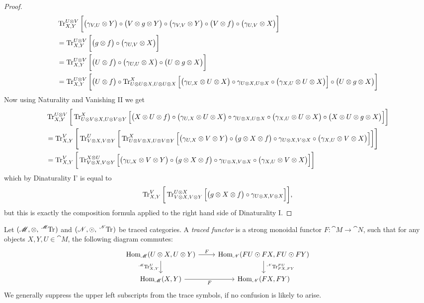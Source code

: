 \documentclass[12pt,oneside,article,draft]{memoir}
\begin{document}
{\begin{proof}
{ \begin{align*}
  &\operatorname{Tr}^{U\otimes V}_{X,Y}\bigg[\big(\gamma_{V,U}\otimes Y\big)\circ\big(V\otimes g\otimes Y\big)\circ\big(\gamma_{V,V}\otimes Y\big)\circ\big(V\otimes f\big)\circ\big(\gamma_{U,V}\otimes X\big)\bigg]\\
  &=\operatorname{Tr}^{U\otimes V}_{X,Y}\bigg[\big(g\otimes f\big)\circ\big(\gamma_{U,V}\otimes X\big)\bigg]\\
  &=\operatorname{Tr}^{U\otimes V}_{X,Y}\bigg[\big(U\otimes f\big)\circ\big(\gamma_{U,U}\otimes X\big)\circ\big(U\otimes g\otimes X\big)\bigg]\\
  &=\operatorname{Tr}^{U\otimes V}_{X,Y}\bigg[\big(U\otimes f\big)\circ\operatorname{Tr}^X_{U\otimes U\otimes X,U\otimes U\otimes X}\Big[\big(\gamma_{U,X}\otimes U\otimes X\big)\circ\gamma_{U\otimes X, U\otimes X}\circ\big(\gamma_{X,U}\otimes U\otimes X\big)\Big]\circ\big(U\otimes g\otimes X\big)\bigg]
 \end{align*}
 Now using Naturality and Vanishing II we get
 \begin{align*}
  &\operatorname{Tr}^{U\otimes V}_{X,Y}\bigg[\operatorname{Tr}^X_{U\otimes V\otimes X,U\otimes V\otimes Y}\Big[\big(X\otimes U\otimes f\big)\circ\big(\gamma_{U,X}\otimes U\otimes X\big)\circ\gamma_{U\otimes X, U\otimes X}\circ\big(\gamma_{X,U}\otimes U\otimes X\big)\circ\big(X\otimes U\otimes g\otimes X\big)\Big]\bigg]\\
  &=\operatorname{Tr}^V_{X,Y}\Bigg[\operatorname{Tr}^U_{V\otimes X,V\otimes Y}\bigg[\operatorname{Tr}^X_{U\otimes V\otimes X,U\otimes V\otimes Y}\Big[\big(\gamma_{U,X}\otimes V\otimes Y\big)\circ\big(g\otimes X\otimes f\big)\circ\gamma_{U\otimes X, V\otimes X}\circ\big(\gamma_{X,U}\otimes V\otimes X\big)\Big]\bigg]\Bigg]\\
  &=\operatorname{Tr}^V_{X,Y}\bigg[\operatorname{Tr}^{X\otimes U}_{V\otimes X,V\otimes Y}\Big[\big(\gamma_{U,X}\otimes V\otimes Y\big)\circ\big(g\otimes X\otimes f\big)\circ\gamma_{U\otimes X, V\otimes X}\circ\big(\gamma_{X,U}\otimes V\otimes X\big)\Big]\bigg]
 \end{align*}
 which by Dinaturality I' is equal to
 \[\operatorname{Tr}^V_{X,Y}\bigg[\operatorname{Tr}^{U\otimes X}_{V\otimes X,V\otimes Y}\Big[\big(g\otimes X\otimes f\big)\circ\gamma_{U\otimes X, V\otimes X}\Big]\bigg],\]
 but this is exactly the composition formula applied to the right hand side of Dinaturality I.}%
\end{proof}
\begin{definition}\label{def:traced functor}

Let $(\cat{M},\otimes,\tensor*[^{\cat{M}}]{\Tr}{})$ and $(\cat{N},\odot,\tensor*[^{\cat{N}}]{\Tr}{})$ be traced categories. A \emph{traced functor} is a strong monoidal functor $F\colon\cat{M}\to\cat{N}$, such that for any objects $X,Y,U\in\cat{M}$, the following diagram commutes:
$$
\begin{tikzcd}
	\Hom_{\cat{M}}(U\otimes X,U\otimes Y)
		\rar{F}
		\dar[swap]{\tensor*[^{\cat{M}}]{\Tr}{^U_{X,Y}}}
	& \Hom_{\cat{N}}(FU\odot FX,FU\odot FY)
		\dar{\tensor*[^{\cat{N}}]{\Tr}{^{FU}_{FX,FY}}} \\
	\Hom_{\cat{M}}(X,Y)
		\rar[swap]{F}
	& \Hom_{\cat{N}}(FX,FY)
\end{tikzcd}
$$
We generally suppress the upper left subscripts from the trace symbols, if no confusion is likely to arise.


\end{definition}}
\end{document}
